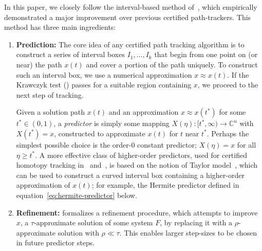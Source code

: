 \documentclass[11pt]{amsart}
\let\oldtextit\textit
\renewcommand\emph[1]{\oldtextit{\color{blue}#1}}
\theoremstyle{definition}
\theoremstyle{remark}
\begin{document}
In this paper, we closely follow the interval-based method of~\cite{guillemot2024validated}, which empirically demonstrated a major improvement over previous certified path-trackers.
This method has three main ingredients:

\begin{enumerate}
    \item \textbf{Prediction: } The core idea of any certified path tracking algorithm is to construct a series of interval boxes $I_1,\dots, I_k$ that begin from one point on (or near) the path $x(t)$ and cover a portion of the path uniquely. To construct such an interval box, we use a numerical approximation $x\approx x(t)$. If the Krawczyk test () passes for a suitable region containing $x$, we proceed to the next step of tracking.

    Given a solution path $x(t)$ and an approximation $x \approx x (t^*)$ for some $t^*\in (0,1)$, a \emph{predictor} is simply some mapping $X(\eta):[t^*,\infty)\to \mathbb{C}^{n}$ with $X(t^*)=x$, constructed to approximate $x(t)$ for $t$ near $t^*.$
    Perhaps the simplest possible choice is the order-$0$ constant predictor; $X(\eta ) = x$ for all $\eta \ge t^*.$
    A more effective class of higher-order predictors, used for certified homotopy tracking in~\cite[Section 6.3]{guillemot2024validated} and~\cite{van2011reliable}, is based on the notion of Taylor model~\cite[Section 9.3]{moore2009introduction}, which can be used to construct a curved interval box containing a higher-order approximation of $x(t)$; for example, the Hermite predictor defined in equation~\eqref{eq:hermite-predictor} below.

\item \textbf{Refinement: }
 formalizes a refinement procedure, which attempts to improve $x$, a $\tau$-approximate solution of some system $F$, by replacing it with a $\rho$-approximate solution with $\rho \ll \tau .$
This enables larger step-sizes to be chosen in future predictor steps.  


\end{enumerate}
\end{document}
